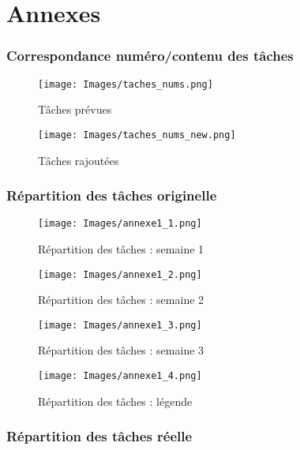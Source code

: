 \documentclass[a4paper,12pt]{article} %
\begin{document}
\renewcommand\partname{}
\part{Annexes}

    \section{\label{annexe1}Correspondance numéro/contenu des tâches}
        
        	\begin{figure}[H]
        	    \centering
        	    \texttt{[image: Images/taches\_nums.png]}
        	    \caption{Tâches prévues}
        	\end{figure}
        
        	\begin{figure}[H]
        	    \centering
        	    \texttt{[image: Images/taches\_nums\_new.png]}
        	    \caption{Tâches rajoutées}
        	\end{figure}

	\section{\label{annexe2}Répartition des tâches originelle}
	
    	\begin{figure}[H]
    	    \centering
    	    \texttt{[image: Images/annexe1\_1.png]}
    	    \caption{Répartition des tâches : semaine 1}
    	\end{figure}
    	
    	\begin{figure}[H]
    	    \centering
    	    \texttt{[image: Images/annexe1\_2.png]}
    	    \caption{Répartition des tâches : semaine 2}
    	\end{figure}
    	
    	\begin{figure}[H]
    	    \centering
    	    \texttt{[image: Images/annexe1\_3.png]}
    	    \caption{Répartition des tâches : semaine 3}
    	\end{figure}
    	
    	\begin{figure}[H]
    	    \centering
    	    \texttt{[image: Images/annexe1\_4.png]}
    	    \caption{Répartition des tâches : légende}
    	\end{figure}
	
	
	
	
	\section{\label{annexe3}Répartition des tâches réelle}

\begin{figure}
\begin{center}
\end{center}
\end{figure}
\end{document}
